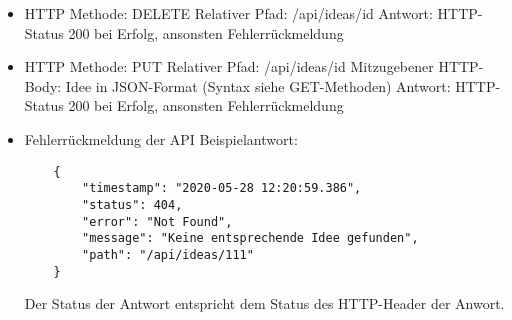 \begin{itemize}
    \item HTTP Methode: DELETE
    \subitem Relativer Pfad: /api/ideas/{id}
    \subitem Antwort: HTTP-Status 200 bei Erfolg, ansonsten Fehlerrückmeldung
\end{itemize}

\begin{itemize}
    \item HTTP Methode: PUT
    \subitem Relativer Pfad: /api/ideas/{id}
    \subitem Mitzugebener HTTP-Body: Idee in JSON-Format (Syntax siehe GET-Methoden)
    \subitem Antwort: HTTP-Status 200 bei Erfolg, ansonsten Fehlerrückmeldung
\end{itemize}

\begin{itemize}
    \item Fehlerrückmeldung der API
    \subitem Beispielantwort:
    \begin{verbatim}
    {
        "timestamp": "2020-05-28 12:20:59.386",
        "status": 404,
        "error": "Not Found",
        "message": "Keine entsprechende Idee gefunden",
        "path": "/api/ideas/111"
    }
    \end{verbatim}
    \subitem Der Status der Antwort entspricht dem Status des HTTP-Header der Anwort.
\end{itemize}
